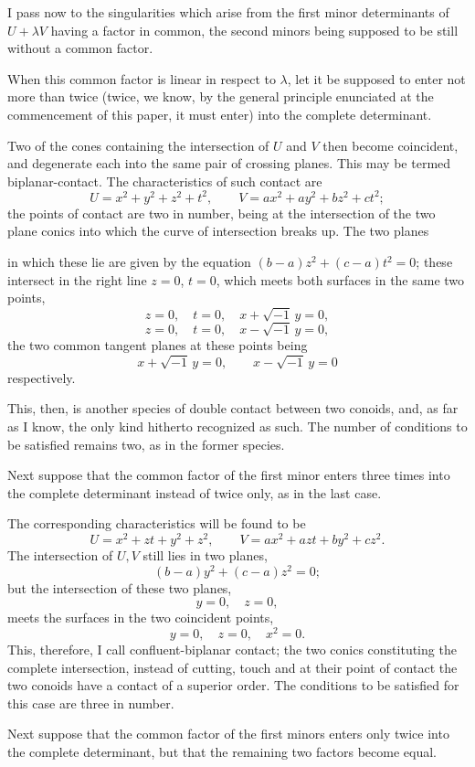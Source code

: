 \documentclass[11pt]{article}
\newcommand{\sourcepage}[1]{\marginpar{\scriptsize p.~#1}}
\begin{document}
{{I pass now to the singularities which arise from the first minor determinants of $U+\lambda V$ having a factor in common, the second minors being supposed to be still without a common factor.

When this common factor is linear in respect to $\lambda$, let it be supposed to enter not more than twice (twice, we know, by the general principle enunciated at the commencement of this paper, it must enter) into the complete determinant.

Two of the cones containing the intersection of $U$ and $V$ then become coincident, and degenerate each into the same pair of crossing planes. This may be termed biplanar-contact. The characteristics of such contact are
\[
U=x^2+y^2+z^2+t^2,
\qquad
V=ax^2+ay^2+bz^2+ct^2;
\]
the points of contact are two in number, being at the intersection of the two plane conics into which the curve of intersection breaks up. The two planes

\sourcepage{231}
in which these lie are given by the equation $(b-a)z^2+(c-a)t^2=0$; these intersect in the right line $z=0$, $t=0$, which meets both surfaces in the same two points,
\[
z=0,
\quad t=0,
\quad x+\sqrt{-1}\,y=0,
\]
\[
z=0,
\quad t=0,
\quad x-\sqrt{-1}\,y=0,
\]
the two common tangent planes at these points being
\[
x+\sqrt{-1}\,y=0,
\qquad
x-\sqrt{-1}\,y=0
\]
respectively.

This, then, is another species of double contact between two conoids, and, as far as I know, the only kind hitherto recognized as such. The number of conditions to be satisfied remains two, as in the former species.

Next suppose that the common factor of the first minor enters three times into the complete determinant instead of twice only, as in the last case.

The corresponding characteristics will be found to be
\[
U=x^2+zt+y^2+z^2,
\qquad
V=ax^2+azt+by^2+cz^2.
\]
The intersection of $U,V$ still lies in two planes,
\[
(b-a)y^2+(c-a)z^2=0;
\]
but the intersection of these two planes,
\[
y=0,
\quad z=0,
\]
meets the surfaces in the two coincident points,
\[
y=0,
\quad z=0,
\quad x^2=0.
\]
This, therefore, I call confluent-biplanar contact; the two conics constituting the complete intersection, instead of cutting, touch and at their point of contact the two conoids have a contact of a superior order. The conditions to be satisfied for this case are three in number.

Next suppose that the common factor of the first minors enters only twice into the complete determinant, but that the remaining two factors become equal.

}}
\end{document}
